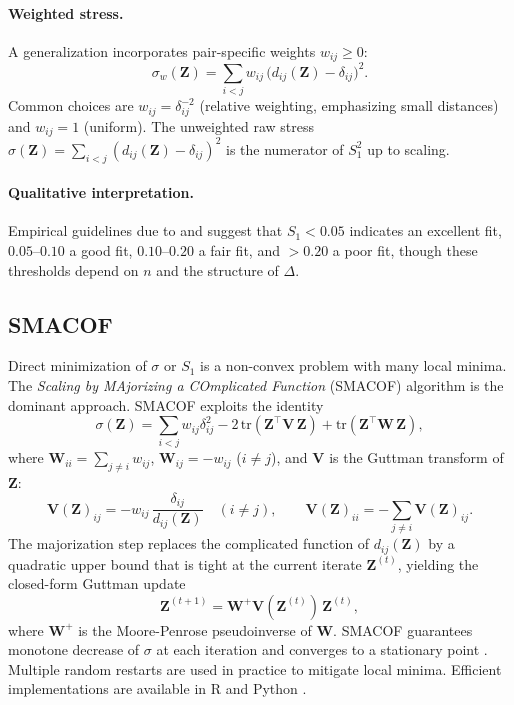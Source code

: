 \documentclass[twoside,11pt]{article}
\newcommand{\bZ}{\mathbf{Z}}
\newcommand{\bV}{\mathbf{V}}
\newcommand{\bW}{\mathbf{W}}
\newcommand{\StressOne}{S_1}
\begin{document}
\paragraph{Weighted stress.}
A generalization incorporates pair-specific weights $w_{ij} \geq 0$:
\begin{equation}
  \sigma_w(\bZ)
  = \sum_{i < j} w_{ij}\,\bigl(d_{ij}(\bZ) - \delta_{ij}\bigr)^2.
  \label{eq:weighted_stress}
\end{equation}
Common choices are $w_{ij} = \delta_{ij}^{-2}$ (relative weighting,
emphasizing small distances) and $w_{ij} = 1$ (uniform).  The unweighted
raw stress $\sigma(\bZ) = \sum_{i<j}(d_{ij}(\bZ) - \delta_{ij})^2$
is the numerator of $\StressOne^2$ up to scaling.

\paragraph{Qualitative interpretation.}
Empirical guidelines due to \citet{kruskal1964nonmetric} and
\citet{borg2005modern} suggest that $\StressOne < 0.05$ indicates an
excellent fit, $0.05$--$0.10$ a good fit, $0.10$--$0.20$ a fair fit, and
$> 0.20$ a poor fit, though these thresholds depend on $n$ and the
structure of $\Delta$.

\subsection{SMACOF}
\label{sec:smacof}

Direct minimization of $\sigma$ or $\StressOne$ is a non-convex problem
with many local minima.  The \emph{Scaling by MAjorizing a COmplicated
Function} (SMACOF) algorithm \citep{deleeuw1977applications,
deleeuw2009multidimensional} is the dominant approach.  SMACOF exploits
the identity
\begin{equation}
  \sigma(\bZ) = \sum_{i<j}w_{ij}\delta_{ij}^2
               - 2\,\mathrm{tr}(\bZ^\top \bV\,\bZ)
               + \mathrm{tr}(\bZ^\top \bW\,\bZ),
  \label{eq:smacof_decomp}
\end{equation}
where $\bW_{ii} = \sum_{j \neq i} w_{ij}$, $\bW_{ij} = -w_{ij}$ ($i \neq
j$), and $\bV$ is the Guttman transform of $\bZ$:
\begin{equation}
  \bV(\bZ)_{ij} = -w_{ij}\,\frac{\delta_{ij}}{d_{ij}(\bZ)}\quad(i \neq j),
  \qquad
  \bV(\bZ)_{ii} = -\sum_{j \neq i} \bV(\bZ)_{ij}.
  \label{eq:guttman}
\end{equation}
The majorization step replaces the complicated function of $d_{ij}(\bZ)$
by a quadratic upper bound that is tight at the current iterate $\bZ^{(t)}$,
yielding the closed-form Guttman update
\begin{equation}
  \bZ^{(t+1)} = \bW^+ \bV(\bZ^{(t)})\,\bZ^{(t)},
  \label{eq:guttman_update}
\end{equation}
where $\bW^+$ is the Moore-Penrose pseudoinverse of $\bW$.  SMACOF
guarantees monotone decrease of $\sigma$ at each iteration and converges
to a stationary point \citep{deleeuw2009multidimensional}.  Multiple random
restarts are used in practice to mitigate local minima.  Efficient
implementations are available in R \citep{deleeuw2009multidimensional}
and Python \citep{pedregosa2011scikit}.
\end{document}
